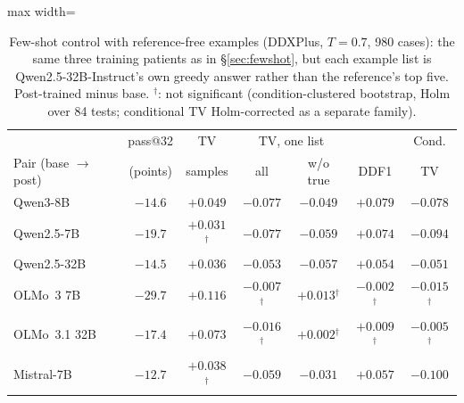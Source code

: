 \documentclass[11pt]{article}
\begin{document}
\begin{table}[t]
\centering\small
\begin{adjustbox}{max width=\linewidth}
\begin{tabular}{lcccccc}
\toprule
 & pass@32 & TV & \multicolumn{2}{c}{TV, one list} & & Cond. \\
Pair (base $\rightarrow$ post) & (points) & samples & all & w/o true & DDF1 & TV \\
\midrule
Qwen3-8B & $-14.6$ & $+0.049$ & $-0.077$ & $-0.049$ & $+0.079$ & $-0.078$ \\
Qwen2.5-7B & $-19.7$ & $+0.031$$^{\dagger}$ & $-0.077$ & $-0.059$ & $+0.074$ & $-0.094$ \\
Qwen2.5-32B & $-14.5$ & $+0.036$ & $-0.053$ & $-0.057$ & $+0.054$ & $-0.051$ \\
OLMo~3 7B & $-29.7$ & $+0.116$ & $-0.007$$^{\dagger}$ & $+0.013$$^{\dagger}$ & $-0.002$$^{\dagger}$ & $-0.015$$^{\dagger}$ \\
OLMo~3.1 32B & $-17.4$ & $+0.073$ & $-0.016$$^{\dagger}$ & $+0.002$$^{\dagger}$ & $+0.009$$^{\dagger}$ & $-0.005$$^{\dagger}$ \\
Mistral-7B & $-12.7$ & $+0.038$$^{\dagger}$ & $-0.059$ & $-0.031$ & $+0.057$ & $-0.100$ \\
\bottomrule
\end{tabular}
\end{adjustbox}
\caption{Few-shot control with reference-free examples (DDXPlus, $T{=}0.7$, 980 cases): the same three training patients as in \S\ref{sec:fewshot}, but each example list is Qwen2.5-32B-Instruct's own greedy answer rather than the reference's top five. Post-trained minus base. $^{\dagger}$: not significant (condition-clustered bootstrap, Holm over 84 tests; conditional TV Holm-corrected as a separate family).}
\label{tab:refree}
\end{table}
\end{document}
